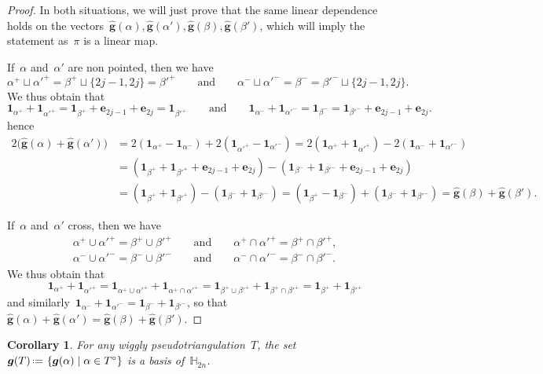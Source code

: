 \documentclass{amsart}
\newtheorem{corollary}[theorem]{Corollary}
\theoremstyle{definition}
\newcommand{\HH}{\mathbb{H}} %
\renewcommand{\b}[1]{{\boldsymbol{#1}}} %
\newcommand{\set}[2]{\left\{ #1 \;\middle|\; #2 \right\}} %
\newcommand{\one}{\b{1}} %
\newcommand{\eqdef}{\mbox{\,\raisebox{0.2ex}{\scriptsize\ensuremath{\mathrm:}}\ensuremath{=}\,}} %
\begin{document}
\begin{proof}
In both situations, we will just prove that the same linear dependence holds on the vectors~$\hat{\b{g}}(\alpha), \hat{\b{g}}(\alpha'), \hat{\b{g}}(\beta), \hat{\b{g}}(\beta')$, which will imply the statement as~$\pi$ is a linear map.

If~$\alpha$ and~$\alpha'$ are non pointed, then we have
\[
\alpha^+ \sqcup \alpha'^+ = \beta^+ \sqcup \{2j-1, 2j\} = \beta'^+
\qquad\text{and}\qquad 
\alpha^- \sqcup \alpha'^- = \beta^- = \beta'^- \sqcup \{2j-1, 2j\}.
\]
We thus obtain that
\[
\one_{\alpha^+} + \one_{\alpha'^+} = \one_{\beta^+} + \b{e}_{2j-1} + \b{e}_{2j} = \one_{\beta'^+}
\qquad\text{and}\qquad 
\one_{\alpha^-} + \one_{\alpha'^-} = \one_{\beta^-} = \one_{\beta'^-} + \b{e}_{2j-1} + \b{e}_{2j}.
\]
hence
\begin{align*}
2 \big( \hat{\b{g}}(\alpha) + \hat{\b{g}}(\alpha') \big)
& = 2(\one_{\alpha^+} - \one_{\alpha^-}) + 2(\one_{\alpha'^+} - \one_{\alpha'^-})
= 2(\one_{\alpha^+} + \one_{\alpha'^+}) - 2(\one_{\alpha^-} + \one_{\alpha'^-}) \\
& = (\one_{\beta^+} + \one_{\beta'^+} + \b{e}_{2j-1} + \b{e}_{2j}) - (\one_{\beta^-} + \one_{\beta'^-} + \b{e}_{2j-1} + \b{e}_{2j}) \\
& = (\one_{\beta^+} + \one_{\beta'^+}) - (\one_{\beta^-} + \one_{\beta'^-})
= (\one_{\beta^+} - \one_{\beta^-}) + (\one_{\beta^-} + \one_{\beta'^-})
= \hat{\b{g}}(\beta) + \hat{\b{g}}(\beta').
\end{align*}

If~$\alpha$ and~$\alpha'$ cross, then we have
\begin{gather*}
\alpha^+ \cup \alpha'^+ = \beta^+ \cup \beta'^+ \qquad\text{and}\qquad \alpha^+ \cap \alpha'^+ = \beta^+ \cap \beta'^+, \\
\alpha^- \cup \alpha'^- = \beta^- \cup \beta'^- \qquad\text{and}\qquad \alpha^- \cap \alpha'^- = \beta^- \cap \beta'^-.
\end{gather*}
We thus obtain that
\[
\one_{\alpha^+} + \one_{\alpha'^+} = \one_{\alpha^+ \cup \alpha'^+} + \one_{\alpha^+ \cap \alpha'^+} = \one_{\beta^+ \cup \beta'^+} + \one_{\beta^+ \cap \beta'^+} = \one_{\beta^+} + \one_{\beta'^+}
\]
and similarly~$\one_{\alpha^-} + \one_{\alpha'^-} = \one_{\beta^-} + \one_{\beta'^-}$, so that~$\hat{\b{g}}(\alpha) + \hat{\b{g}}(\alpha') =\hat{\b{g}}(\beta) + \hat{\b{g}}(\beta')$.
\end{proof}

\begin{corollary}
\label{coro:basis}
For any wiggly pseudotriangulation~$T$, the set~$\b{g}(T) \eqdef \set{\b{g}(\alpha)}{\alpha \in T^\circ}$ is a basis of~$\HH_{2n}$.
\end{corollary}
\end{document}
